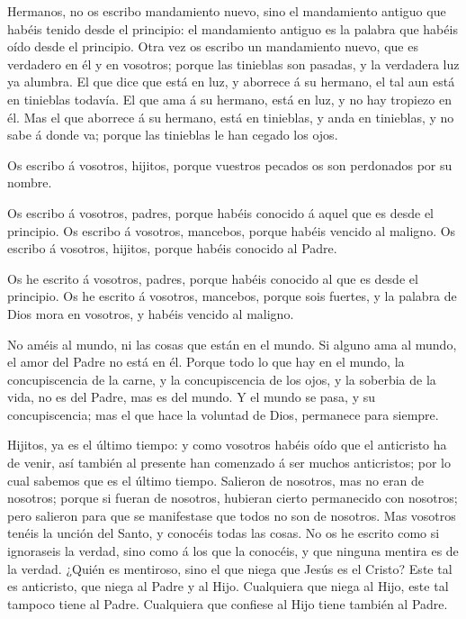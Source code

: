  Hermanos, no os escribo mandamiento nuevo, sino el
mandamiento antiguo que habéis tenido desde el principio: el mandamiento
antiguo es la palabra que habéis oído desde el principio. 
Otra vez os escribo un mandamiento nuevo, que es verdadero en él y en
vosotros; porque las tinieblas son pasadas, y la verdadera luz ya
alumbra.  El que dice que está en luz, y aborrece á su
hermano, el tal aun está en tinieblas todavía.  El que ama
á su hermano, está en luz, y no hay tropiezo en él.  Mas el
que aborrece á su hermano, está en tinieblas, y anda en tinieblas, y no
sabe á donde va; porque las tinieblas le han cegado los ojos.

 Os escribo á vosotros, hijitos, porque vuestros pecados os
son perdonados por su nombre.

 Os escribo á vosotros, padres, porque habéis conocido á
aquel que es desde el principio. Os escribo á vosotros, mancebos, porque
habéis vencido al maligno. Os escribo á vosotros, hijitos, porque habéis
conocido al Padre.

 Os he escrito á vosotros, padres, porque habéis conocido
al que es desde el principio. Os he escrito á vosotros, mancebos, porque
sois fuertes, y la palabra de Dios mora en vosotros, y habéis vencido al
maligno.

 No améis al mundo, ni las cosas que están en el mundo. Si
alguno ama al mundo, el amor del Padre no está en él. 
Porque todo lo que hay en el mundo, la concupiscencia de la carne, y la
concupiscencia de los ojos, y la soberbia de la vida, no es del Padre,
mas es del mundo.  Y el mundo se pasa, y su concupiscencia;
mas el que hace la voluntad de Dios, permanece para siempre.

 Hijitos, ya es el último tiempo: y como vosotros habéis
oído que el anticristo ha de venir, así también al presente han
comenzado á ser muchos anticristos; por lo cual sabemos que es el último
tiempo.  Salieron de nosotros, mas no eran de nosotros;
porque si fueran de nosotros, hubieran cierto permanecido con nosotros;
pero salieron para que se manifestase que todos no son de nosotros.
 Mas vosotros tenéis la unción del Santo, y conocéis todas
las cosas.  No os he escrito como si ignoraseis la verdad,
sino como á los que la conocéis, y que ninguna mentira es de la verdad.
 ¿Quién es mentiroso, sino el que niega que Jesús es el
Cristo? Este tal es anticristo, que niega al Padre y al Hijo.
 Cualquiera que niega al Hijo, este tal tampoco tiene al
Padre. Cualquiera que confiese al Hijo tiene también al Padre.

